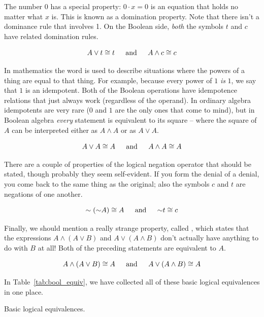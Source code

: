 The number 0 has a special property: $0 \cdot x = 0$ is an equation that 
holds no matter what $x$ is.  This is known as a domination property.  Note 
that there isn't a dominance rule that involves 1.
 On the Boolean side, 
{\em both} the symbols $t$ and $c$ have related domination rules.

\[ A \lor t \cong t \mbox{\rule{12pt}{0pt} and \rule{12pt}{0pt}} 
A \land c \cong c \]
 
In mathematics the word  is used to describe situations where 
the powers of a thing are equal to that thing.  For example, because every power of $1$ {\em is} $1$, we say that $1$ is an idempotent.  Both of the Boolean operations 
have idempotence relations that just always work (regardless of the operand).
In ordinary algebra idempotents are very rare ($0$ and $1$ are the only
ones that come to mind), but in Boolean algebra {\em every} statement
is equivalent to its square -- where the square of $A$ can be interpreted 
either as $A \land A$ or as $A \lor A$.

\[ A \lor A \cong A \mbox{\rule{12pt}{0pt} and \rule{12pt}{0pt}}%
A \land A \cong A \]

There are a couple of properties of the logical negation operator 
that should be stated, though probably they seem self-evident.
If you form the denial of a denial, you come back to the 
same thing as the original; also the symbols $c$ and $t$ are negations
of one another.

\[ \lnot({\lnot}A) \cong A \mbox{\rule{12pt}{0pt} and \rule{12pt}{0pt}}%
{\lnot}t  \cong c \] 

Finally, we should mention a really strange property, called 
,
which states that the expressions $A \land (A \lor B)$ and $A \lor (A \land B)$
don't actually have anything to do with $B$ at all!  Both of the preceding
statements are equivalent to $A$.

\[ A \land (A \lor B) \cong A \mbox{\rule{12pt}{0pt} and \rule{12pt}{0pt}}%
A \lor (A \land B) \cong A \]

In Table~\ref{tab:bool_equiv}, we have collected all of these basic logical
equivalences in one place.

\begin{table}[hbt] 
\begin{center}

\end{center} 
\caption{Basic logical equivalences. }
\label{tab:bool_equiv}
\end{table}

